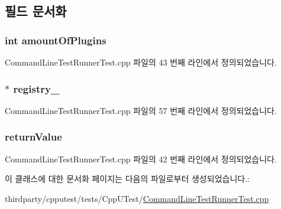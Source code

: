 \subsection{필드 문서화}
\subsubsection[{\texorpdfstring{amount\+Of\+Plugins}{amountOfPlugins}}]{\setlength{\rightskip}{0pt plus 5cm}int amount\+Of\+Plugins}\hypertarget{class_dummy_plugin_which_counts_the_plugins_a2128dae723fa4cac7469b26367e0b6ba}{}\label{class_dummy_plugin_which_counts_the_plugins_a2128dae723fa4cac7469b26367e0b6ba}


Command\+Line\+Test\+Runner\+Test.\+cpp 파일의 43 번째 라인에서 정의되었습니다.

\subsubsection[{\texorpdfstring{registry\+\_\+}{registry_}}]{$\ast$ registry\+\_\+\hspace{0.3cm}{\ttfamily [private]}}\hypertarget{class_dummy_plugin_which_counts_the_plugins_a06daa3d9c1f367883447738388bd760d}{}\label{class_dummy_plugin_which_counts_the_plugins_a06daa3d9c1f367883447738388bd760d}


Command\+Line\+Test\+Runner\+Test.\+cpp 파일의 57 번째 라인에서 정의되었습니다.

\subsubsection[{\texorpdfstring{return\+Value}{returnValue}}]{ return\+Value}\hypertarget{class_dummy_plugin_which_counts_the_plugins_ac057155c109f2751e833df569a306652}{}\label{class_dummy_plugin_which_counts_the_plugins_ac057155c109f2751e833df569a306652}


Command\+Line\+Test\+Runner\+Test.\+cpp 파일의 42 번째 라인에서 정의되었습니다.



이 클래스에 대한 문서화 페이지는 다음의 파일로부터 생성되었습니다.\+:\begin{DoxyCompactItemize}
\item 
thirdparty/cpputest/tests/\+Cpp\+U\+Test/\hyperlink{_command_line_test_runner_test_8cpp}{Command\+Line\+Test\+Runner\+Test.\+cpp}\end{DoxyCompactItemize}
